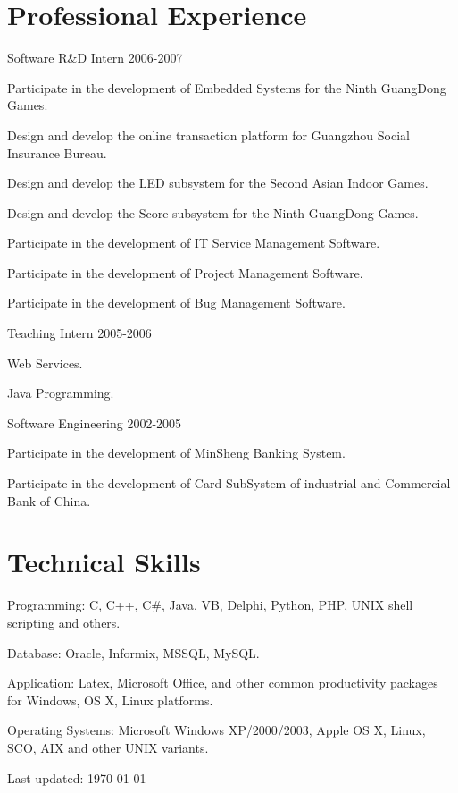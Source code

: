 \documentclass[10pt,letterpaper]{article}
\def\footerlink{}
\renewenvironment{itemize}{
  \begin{list}{}{
    \setlength{\leftmargin}{1.5em}
  }
}{
  \end{list}
}
\begin{document}
\section*{Professional Experience}

Software R\&D Intern 2006-2007
\begin{itemize} 
\item Participate in the development of Embedded Systems for the Ninth GuangDong Games.
\item Design and develop the online transaction platform for Guangzhou Social Insurance Bureau.
\item Design and develop the LED subsystem for the Second Asian Indoor Games.
\item Design and develop the Score subsystem for the Ninth GuangDong Games.
\item Participate in the development of IT Service Management Software.
\item Participate in the development of Project Management Software.
\item Participate in the development of Bug Management Software.
\end{itemize} 
Teaching Intern 2005-2006
\begin{itemize}
\item Web Services.
\item Java Programming.
\end{itemize} 
Software Engineering 2002-2005
\begin{itemize}
\item Participate in the development of MinSheng Banking System.
\item Participate in the development of Card SubSystem of industrial and Commercial Bank of China.
\end{itemize} 

\section*{Technical Skills}
\begin {itemize}
\item Programming: C, C++, C\#, Java, VB, Delphi, Python, PHP, UNIX shell scripting and others.
\item Database: Oracle, Informix, MSSQL, MySQL.
\item Application: Latex, Microsoft Office, and other common productivity packages for Windows, OS X, Linux platforms.
\item Operating Systems: Microsoft Windows XP/2000/2003, Apple OS X, Linux, SCO, AIX and other UNIX variants.
\end {itemize}

\begin{center}
  \begin{footnotesize}
    Last updated: \today \\
    \href{\footerlink}{\texttt{\footerlink}}
  \end{footnotesize}
\end{center}
\end{document}
